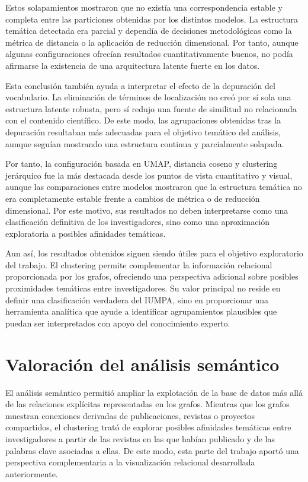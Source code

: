 \documentclass[11pt,spanish,listoffigures,listoftables]{tfgetsinf}
\begin{document}
Estos solapamientos mostraron que no existía una correspondencia estable y completa entre las particiones obtenidas por los distintos modelos. La estructura temática detectada era parcial y dependía de decisiones metodológicas como la métrica de distancia o la aplicación de reducción dimensional. Por tanto, aunque algunas configuraciones ofrecían resultados cuantitativamente buenos, no podía afirmarse la existencia de una arquitectura latente fuerte en los datos.

Esta conclusión también ayuda a interpretar el efecto de la depuración del vocabulario. La eliminación de términos de localización no creó por sí sola una estructura latente robusta, pero sí redujo una fuente de similitud no relacionada con el contenido científico. De este modo, las agrupaciones obtenidas tras la depuración resultaban más adecuadas para el objetivo temático del análisis, aunque seguían mostrando una estructura continua y parcialmente solapada.

Por tanto, la configuración basada en UMAP, distancia coseno y clustering jerárquico fue la más destacada desde los puntos de vista cuantitativo y visual, aunque las comparaciones entre modelos mostraron que la estructura temática no era completamente estable frente a cambios de métrica o de reducción dimensional. Por este motivo, sus resultados no deben interpretarse como una clasificación definitiva de los investigadores, sino como una aproximación exploratoria a posibles afinidades temáticas.

Aun así, los resultados obtenidos siguen siendo útiles para el objetivo exploratorio del trabajo. El clustering permite complementar la información relacional proporcionada por los grafos, ofreciendo una perspectiva adicional sobre posibles proximidades temáticas entre investigadores. Su valor principal no reside en definir una clasificación verdadera del IUMPA, sino en proporcionar una herramienta analítica que ayude a identificar agrupamientos plausibles que puedan ser interpretados con apoyo del conocimiento experto.

\section{Valoración del análisis semántico}

El análisis semántico permitió ampliar la explotación de la base de datos más allá de las relaciones explícitas representadas en los grafos. Mientras que los grafos muestran conexiones derivadas de publicaciones, revistas o proyectos compartidos, el clustering trató de explorar posibles afinidades temáticas entre investigadores a partir de las revistas en las que habían publicado y de las palabras clave asociadas a ellas. De este modo, esta parte del trabajo aportó una perspectiva complementaria a la visualización relacional desarrollada anteriormente.
\end{document}
